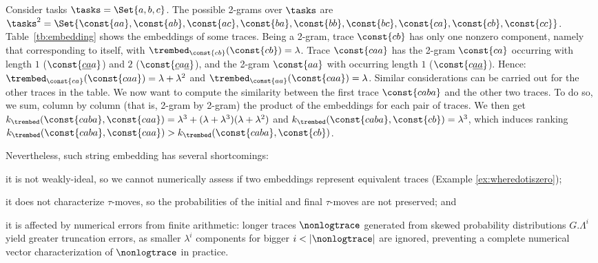 \begin{example}\label{ex:wheredotiszero} %
	Consider tasks $\tasks=\Set{a,b,c}$. The possible 2-grams over $\tasks$ are $\tasks^2=\Set{\const{aa},\const{ab},\const{ac},\const{ba},\const{bb},\const{bc},\const{ca},\const{cb},\const{cc}}$. Table~\ref{tb:embedding} shows the embeddings of some traces. Being a 2-gram, trace $\const{cb}$ has only one nonzero component, namely that corresponding to itself, with $\trembed_{\const{cb}}(\const{cb})=\lambda$. Trace $\const{caa}$ has the 2-gram $\const{ca}$ occurring with length $1$ ($\const{\underline{ca}a}$) and $2$ ($\const{\underline{c}a\underline{a}}$), and the 2-gram $\const{aa}$ with occurring length $1$ ($\const{c\underline{aa}}$). Hence: $\trembed_{\const{ca}}(\const{caa})=\lambda+\lambda^2$ and  $\trembed_{\const{aa}}(\const{caa})=\lambda$.  Similar considerations can be carried out for the other traces in the table.
	We now want to compute the similarity between the first trace $\const{caba}$ and the other two traces. To do so, we sum, column by column (that is, 2-gram by 2-gram) the product of the embeddings for each pair of traces. We then get $k_{\trembed}(\const{caba},\const{caa})=\lambda^3+(\lambda+\lambda^3)(\lambda+\lambda^2)$ and $k_{\trembed}(\const{caba},\const{cb})=\lambda^3
	$,
	which induces ranking $
	k_{\trembed}(\const{caba},\const{caa})>
	k_{\trembed}(\const{caba},\const{cb})
	$.
\end{example}

Nevertheless, such string embedding has several shortcomings: \begin{alphalist}
	\item it is not weakly-ideal, so we cannot numerically assess if two embeddings represent equivalent traces 
	(Example \ref{ex:wheredotiszero});
	\item it does not characterize $\tau$-moves, so the probabilities of the initial and final $\tau$-moves are not preserved; and
	\item it is affected by numerical errors from finite arithmetic: longer traces $\nonlogtrace$ generated from skewed probability 
	distributions $G.\Lambda^i$ yield greater truncation errors, as smaller $\lambda^i$ components for bigger 
	$i<|\nonlogtrace|$ are ignored, preventing a complete numerical vector characterization of  $\nonlogtrace$ in practice.
\end{alphalist}

\endinput




